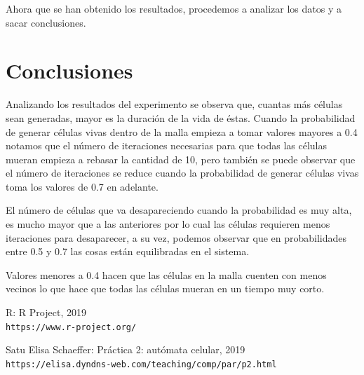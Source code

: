 \documentclass{article}
\begin{document}
Ahora que se han obtenido los resultados, procedemos a analizar los datos y a sacar conclusiones.

\section{Conclusiones}
Analizando los resultados del experimento se observa que, cuantas más células sean generadas, mayor es la duración de la vida de éstas. Cuando la probabilidad de generar células vivas dentro de la malla empieza a tomar valores mayores a 0.4 notamos que el número de iteraciones necesarias para que todas las células mueran empieza a rebasar la cantidad de 10, pero también se puede observar que el número de iteraciones se reduce cuando la probabilidad de generar células vivas toma los valores de 0.7 en adelante.

El número de células que va desapareciendo cuando la probabilidad es muy alta, es mucho mayor que a las anteriores por lo cual las células requieren menos iteraciones para desaparecer, a su vez, podemos observar que en probabilidades entre 0.5 y 0.7 las cosas están equilibradas en el sistema. 

Valores menores a 0.4 hacen que las células en la malla cuenten con menos vecinos lo que hace que todas las células mueran en un tiempo muy corto.

\medskip

\begin{thebibliography}{9}

R:  R Project, 2019
\\\texttt{https://www.r-project.org/}

Satu Elisa Schaeffer: Práctica 2: autómata celular, 2019
\\\texttt{https://elisa.dyndns-web.com/teaching/comp/par/p2.html}


\end{thebibliography}
\end{document}
